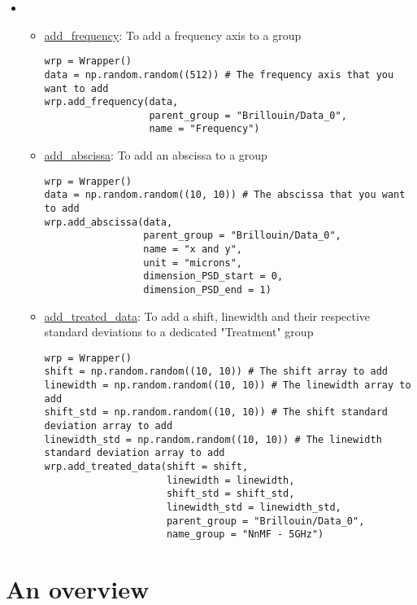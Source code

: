 \begin{tcolorbox}
\begin{itemize}
    \item[] \begin{itemize}
        \item \hyperref[subsec:wrapper.add_frequency]{add\_frequency}: To add a frequency axis to a group
\begin{lstlisting}
wrp = Wrapper()
data = np.random.random((512)) # The frequency axis that you want to add
wrp.add_frequency(data,
                  parent_group = "Brillouin/Data_0", 
                  name = "Frequency")
\end{lstlisting}
        \item \hyperref[subsec:wrapper.add_abscissa]{add\_abscissa}: To add an abscissa to a group
\begin{lstlisting}
wrp = Wrapper()
data = np.random.random((10, 10)) # The abscissa that you want to add
wrp.add_abscissa(data,
                 parent_group = "Brillouin/Data_0", 
                 name = "x and y",
                 unit = "microns",
                 dimension_PSD_start = 0,
                 dimension_PSD_end = 1)
\end{lstlisting}
        \item \hyperref[subsec:wrapper.add_treated_data]{add\_treated\_data}: To add a shift, linewidth and their respective standard deviations to a dedicated "Treatment" group
\begin{lstlisting}
wrp = Wrapper()
shift = np.random.random((10, 10)) # The shift array to add
linewidth = np.random.random((10, 10)) # The linewidth array to add
shift_std = np.random.random((10, 10)) # The shift standard deviation array to add
linewidth_std = np.random.random((10, 10)) # The linewidth standard deviation array to add
wrp.add_treated_data(shift = shift,
                     linewidth = linewidth,
                     shift_std = shift_std,
                     linewidth_std = linewidth_std,
                     parent_group = "Brillouin/Data_0", 
                     name_group = "NnMF - 5GHz")
\end{lstlisting}
    \end{itemize}
\end{itemize}
\end{tcolorbox}

\section{An overview}

